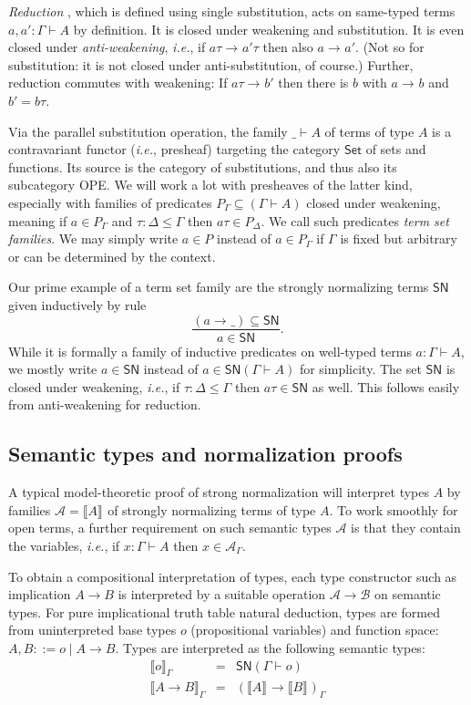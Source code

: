 \documentclass[a4paper,USenglish,cleveref, autoref, thm-restate]{lipics-v2021}
\newcommand{\ie}{\emph{i.e.}\xspace}
\newcommand{\den}[2][]{\llbracket#2\rrbracket^{#1}}
\newcommand{\ru}{\dfrac}
\newcommand{\Den}[2]{\den{#1}_{#2}}
\newcommand{\Set}{\mathsf{Set}}
\newcommand{\red}[1][]{\longrightarrow_{#1}}
\newcommand{\A}{\mathcal{A}}
\newcommand{\B}{\mathcal{B}}
\newcommand{\SN}{\mathsf{SN}}
\begin{document}
\emph{Reduction} \fbox{$a \red a'$}, which is defined using single substitution,
acts on same-typed terms
$a,a' : \Gamma \vdash A$ by definition.  It is closed under weakening
and substitution.  It is even closed under \emph{anti-weakening}, \ie,
if $a\tau \red a'\tau$ then also $a \red a'$.  (Not so for
substitution: it is not closed under anti-substitution, of course.)
Further, reduction commutes with weakening:  If $a\tau \red b'$ then there is
$b$ with $a \red b$ and $b' = b\tau$.

Via the parallel substitution operation, the family $\_ \vdash A$ of
terms of type $A$ is a contravariant functor (\ie, presheaf) targeting the
category $\Set$ of sets and functions.
Its source is the category of
substitutions, and thus also its subcategory OPE.  We will work a
lot with presheaves of the latter kind, especially with families of
predicates $P_\Gamma \subseteq (\Gamma \vdash A)$ closed under
weakening, meaning if $a \in P_\Gamma$ and $\tau : \Delta \leq \Gamma$
then $a \tau \in P_\Delta$.  We call such predicates \emph{term set
  families}.
We may simply write $a \in P$ instead of $a \in P_\Gamma$ if $\Gamma$
is fixed but arbitrary or can be determined by the context.

Our prime example of a term set family are the strongly normalizing
terms $\SN$ given inductively by rule
\[
  \ru{(a \red \_) \subseteq \SN
    }{a \in \SN}
  .
\]
While it is formally a family of inductive predicates on well-typed terms
$a : \Gamma \vdash A$, we mostly write $a \in \SN$ instead of
$a \in \SN(\Gamma \vdash A)$ for simplicity.  The set $\SN$ is closed
under weakening, \ie, if $\tau : \Delta \leq \Gamma$ then
$a\tau \in \SN$ as well.  This follows easily from anti-weakening for
reduction.

\subsection{Semantic types and normalization proofs}

A typical model-theoretic proof of strong normalization will interpret
types $A$ by families $\A = \den A$ of strongly normalizing terms of type $A$.
To work smoothly for open terms, a further requirement on such
semantic types $\A$ is that they contain the variables, \ie,
if $x : \Gamma \vdash A$ then $x \in \A_\Gamma$.

To obtain a compositional interpretation of types, each type
constructor such as implication $A \to B$ is interpreted by a suitable
operation $\A \to \B$ on semantic types.
For pure implicational truth table natural deduction, types are formed
from uninterpreted base types $o$ (propositional variables) and
function space: $A,B ::= o \mid A \to B$.  Types are interpreted as
the following semantic types:
\[
\begin{array}{lll}
  \Den o \Gamma & = & \SN(\Gamma \vdash o) \\
  \Den{A \to B} \Gamma & = & (\den A \to \den B)_\Gamma \\
\end{array}
\]
\end{document}
